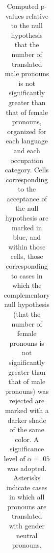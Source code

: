 \documentclass[twoside,11pt]{article}
\begin{document}
\begin{table}[H]
\begin{tabular}{|m{1.75cm}|cccccccccccc|c|}
\end{tabular}
\caption{Computed p-values relative to the null hypothesis that the number of translated male pronouns is not significantly greater than that of female pronouns, organized for each language and each occupation category. Cells corresponding to the acceptance of the null hypothesis are marked in blue, and within those cells, those corresponding to cases in which the complementary null hypothesis (that the number of female pronouns is not significantly greater than that of male pronouns) was rejected are marked with a darker shade of the same color. A significance level of $\alpha =.05$ was adopted. Asterisks indicate cases in which all pronouns are translated with gender neutral pronouns.}
\label{tab:pvalues-MF}
\end{table}
\end{document}
